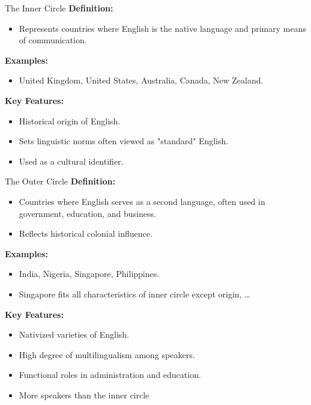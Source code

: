 \documentclass{beamer}
\begin{document}
\begin{frame}{The Inner Circle}
\textbf{Definition:}
\begin{itemize}
    \item Represents countries where English is the native language and primary means of communication.
\end{itemize}

\textbf{Examples:}
\begin{itemize}
    \item United Kingdom, United States, Australia, Canada, New Zealand.
\end{itemize}

\textbf{Key Features:}
\begin{itemize}
    \item Historical origin of English.
    \item Sets linguistic norms often viewed as "standard" English.
    \item Used as a cultural identifier.
\end{itemize}

\end{frame}

\begin{frame}{The Outer Circle}
\textbf{Definition:}
\begin{itemize}
    \item Countries where English serves as a second language, often used in government, education, and business.
    \item Reflects historical colonial influence.
\end{itemize}

\textbf{Examples:}
\begin{itemize}
\item India, Nigeria, Singapore, Philippines.
\item Singapore fits all characteristics of inner circle except origin, \ldots
\end{itemize}

\textbf{Key Features:}
\begin{itemize}
    \item Nativized varieties of English.
    \item High degree of multilingualism among speakers.
    \item Functional roles in administration and education.
    \item More speakers than the inner circle
\end{itemize}

\end{frame}
\end{document}
